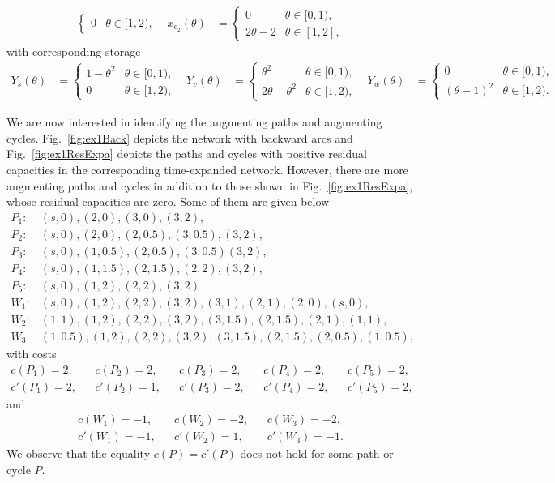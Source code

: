 \documentclass{svjour3}                     \smartqed
\begin{document}
\begin{example}
\begin{align*}
\begin{cases}
            0&\theta\in [1,2),
            \end{cases}&
x_{e_2}(\theta)&=\begin{cases}
            0&\theta\in [0,1),\\
            2\theta-2&\theta\in [1,2],
            \end{cases}
\end{align*}
with corresponding storage
\begin{align*}
Y_{s}(\theta)&=\begin{cases}
            1-\theta^2&\theta\in [0,1),\\
            0&\theta\in [1,2),
            \end{cases}&
Y_{v}(\theta)&=\begin{cases}
            \theta^2&\theta\in [0,1),\\
            2\theta-\theta^2&\theta\in [1,2),
            \end{cases}&
Y_{w}(\theta)&=\begin{cases}
            0&\theta\in [0,1),\\
            (\theta-1)^2&\theta\in [1,2).
            \end{cases}
\end{align*}

We are now interested in identifying the augmenting paths and augmenting cycles. Fig.~\ref{fig:ex1Back} depicts the network with backward arcs and Fig.~\ref{fig:ex1ResExpa} depicts the paths and cycles with positive residual capacities in the corresponding time-expanded network. However, there are more augmenting paths and cycles in addition to those shown in Fig.~\ref{fig:ex1ResExpa}, whose residual capacities are zero. Some of them are given below
\begin{align*}
P_1:&(s,0),(2,0),(3,0),(3,2),\\
P_2:&(s,0),(2,0),(2,0.5),(3,0.5),(3,2),\\
P_3:&(s,0),(1,0.5),(2,0.5),(3,0.5)(3,2),\\
P_4:&(s,0),(1,1.5),(2,1.5),(2,2),(3,2),\\
P_5:&(s,0),(1,2),(2,2),(3,2)\\
W_1:&(s,0),(1,2),(2,2),(3,2),(3,1),(2,1),(2,0),(s,0),\\
W_2:&(1,1),(1,2),(2,2),(3,2),(3,1.5),(2,1.5),(2,1),(1,1),\\
W_3:&(1,0.5),(1,2),(2,2),(3,2),(3,1.5),(2,1.5),(2,0.5),(1,0.5),
\end{align*}
with costs
\begin{align*}
c(P_1)=2,	&& c(P_2)=2,		&&c(P_3)=2,	&& c(P_4)=2,		&&c(P_5)=2,\\
c'(P_1)=2,	&& c'(P_2)=1,	&&c'(P_3)=2,	&& c'(P_4)=2,	 &&c'(P_5)=2,
\end{align*}
and
\begin{align*}
c(W_1)=-1,	&& c(W_2)=-2,		&&c(W_3)=-2,\\
c'(W_1)=-1,	&& c'(W_2)=1,	&&c'(W_3)=-1.
\end{align*}
We observe that the equality $c(P)=c'(P)$ does not hold for some path or cycle $P$.


\end{example}
\end{document}
